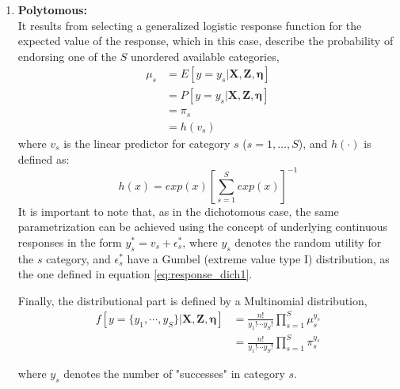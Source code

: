 \begin{enumerate}
	\item \textbf{Polytomous:} \\	
	It results from selecting a generalized logistic response function \citep{Bock_1972} for the expected value of the response, which in this case, describe the probability of endorsing one of the $S$ unordered available categories,
	\begin{equation} \label{eq:link_poly}
		\begin{split}
		\mu_{s} &= E[y=y_{s} | \mathbf{X}, \mathbf{Z}, \pmb{\eta}] \\
		&= P[y=y_{s} | \mathbf{X}, \mathbf{Z}, \pmb{\eta}] \\
		& = \pi_{s} \\
		&= h(v_{s})
		\end{split}
	\end{equation}	
	where $v_{s}$ is the linear predictor for category $s$ ($s=1, \dots, S$), and $h(\cdot)$ is defined as:
	\begin{equation} \label{eq:response_poly}
		h(x) = exp(x)\left[\sum_{s=1}^{S} exp(x)\right]^{-1}
	\end{equation}
	It is important to note that, as in the dichotomous case, the same parametrization can be achieved using the concept of underlying continuous responses in the form $y_{s}^{*} = v_{s} + \epsilon_{s}^{*}$, where $y_{s}$ denotes the random utility for the $s$ category, and $\epsilon_{s}^{*}$ have a Gumbel (extreme value type I) distribution, as the one defined in equation \ref{eq:response_dich1}.
	
	Finally, the distributional part is defined by a Multinomial distribution,
	\begin{equation} \label{eq:dist_poly}
		\begin{split}
		f[y=\{y_{1}, \cdots, y_{S}\} | \mathbf{X}, \mathbf{Z}, \pmb{\eta}] &= \frac{n!}{y_{1}! \cdots y_{S}!} \prod_{s=1}^{S} \mu_{s}^{y_{s}} \\
		&= \frac{n!}{y_{1}! \cdots y_{S}!} \prod_{s=1}^{S} \pi_{s}^{y_{s}}
		\end{split}
	\end{equation}
	
	where $y_{s}$ denotes the number of "successes" in category $s$.

	
	

\end{enumerate}
